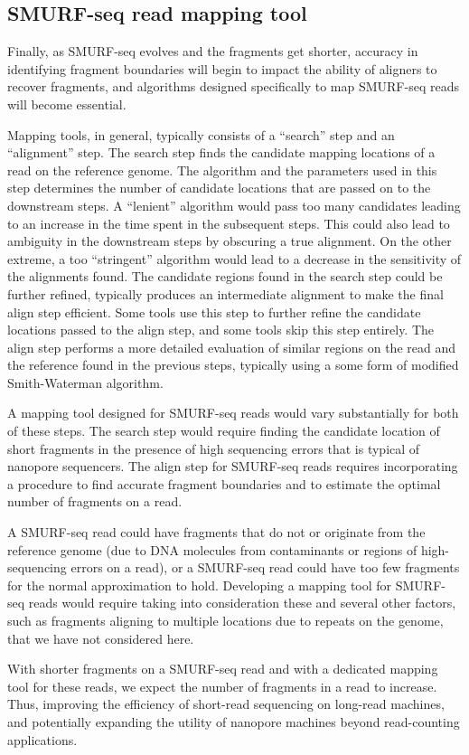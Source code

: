 \subsection*{SMURF-seq read mapping tool}
Finally, as SMURF-seq evolves and the fragments get shorter, accuracy in
identifying fragment boundaries will begin to impact the ability of
aligners to recover fragments, and algorithms designed specifically to
map SMURF-seq reads will become essential.

Mapping tools, in general, typically consists of a ``search'' step and
an ``alignment'' step.
The search step finds the candidate mapping locations of a read on
the reference genome. The algorithm and the parameters used in this step
determines the number of candidate locations that are passed on to the
downstream steps. A ``lenient'' algorithm would pass too many candidates
leading to an increase in the time spent in the subsequent steps. This
could also lead to ambiguity in the downstream steps by obscuring a true
alignment. On the other extreme, a too ``stringent'' algorithm would
lead to a decrease in the sensitivity of the alignments found.
The candidate regions found in the search step could be further
refined, typically produces an intermediate alignment to make the final
align step efficient. Some tools use this step to further refine the
candidate locations passed to the align step, and some tools skip this
step entirely.
The align step performs a more detailed evaluation of similar
regions on the read and the reference found in the previous steps,
typically using a some form of modified Smith-Waterman algorithm.

A mapping tool designed for SMURF-seq reads would vary substantially for
both of these steps. The search step would require finding the
candidate location of short fragments in the presence of high
sequencing errors that is typical of nanopore sequencers.
The align step for SMURF-seq reads requires incorporating a
procedure to find accurate fragment boundaries and to estimate the
optimal number of fragments on a read.

A SMURF-seq read could have fragments that do not or originate from the
reference genome (due to DNA molecules from contaminants or regions of
high-sequencing errors on a read),
or a SMURF-seq read could have too few fragments for the normal
approximation to hold.
%
Developing a mapping tool for SMURF-seq reads would require taking into
consideration these and several other factors, such as fragments
aligning to multiple locations due to repeats on the genome, that we have
not considered here.

With shorter fragments on a SMURF-seq read and with a dedicated mapping
tool for these reads, we expect the number of fragments in a read to
increase. Thus, improving the efficiency of short-read sequencing on
long-read machines, and potentially expanding the utility of nanopore
machines beyond read-counting applications.
